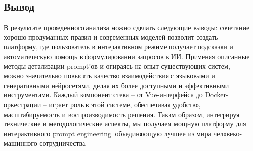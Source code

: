 \subsection{Вывод}
В результате проведенного анализа можно сделать следующие выводы: сочетание хорошо продуманных правил и современных моделей позволит создать платформу, где пользователь в интерактивном режиме получает подсказки и автоматическую помощь в формулировании запросов к ИИ. Применяя описанные методы детализации prompt’ов и опираясь на опыт существующих систем, можно значительно повысить качество взаимодействия с языковыми и генеративными нейросетями, делая их более доступными и эффективными инструментами. Каждый компонент стека – от Vue-интерфейса до Docker-оркестрации – играет роль в этой системе, обеспечивая удобство, масштабируемость и воспроизводимость решения. Таким образом, интегрируя технические и методологические аспекты, мы получаем мощную платформу для интерактивного prompt engineering, объединяющую лучшее из мира человеко-машинного сотрудничества.